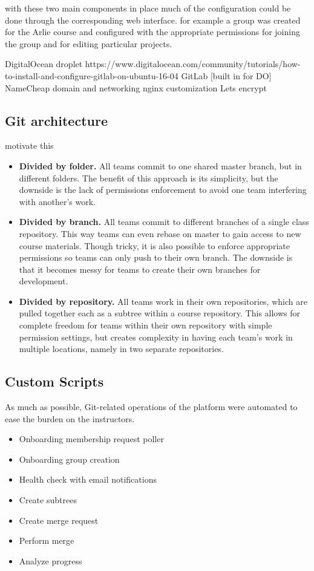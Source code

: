 \documentclass[12pt,twoside,vi]{mitthesis}
\newcommand{\draft}[1]{{\color{blue} #1}}
\begin{document}
{with these two main components in place much of the configuration could be done through the corresponding web interface. for example a group was created for the Arlie course and configured with the appropriate permissions for joining the group and for editing particular projects.

DigitalOcean droplet https://www.digitalocean.com/community/tutorials/how-to-install-and-configure-gitlab-on-ubuntu-16-04 
GitLab [built in for DO]
NameCheap domain and networking
nginx customization
Lets encrypt}

\subsection{Git architecture}

\draft{motivate this

\begin{itemize}
\item \textbf{Divided by folder.} All teams commit to one shared master branch, but in different folders. The benefit of this approach is its simplicity, but the downside is the lack of permissions enforcement to avoid one team interfering with another's work.
\item \textbf{Divided by branch.} All teams commit to different branches of a single class repository. This way teams can even rebase on master to gain access to new course materials. Though tricky, it is also possible to enforce appropriate permissions so teams can only push to their own branch. The downside is that it becomes messy for teams to create their own branches for development.
\item \textbf{Divided by repository.} All teams work in their own repositories, which are pulled together each as a subtree within a course repository. This allows for complete freedom for teams within their own repository with simple permission settings, but creates complexity in having each team's work in multiple locations, namely in two separate repositories. 
\end{itemize}
}

\subsection{Custom Scripts}

\draft{As much as possible, Git-related operations of the platform were automated to ease the burden on the instructors. 
\begin{itemize}
\item Onboarding membership request poller
\item Onboarding group creation
\item Health check with email notifications
\item Create subtrees
\item Create merge request
\item Perform merge
\item Analyze progress
\end{itemize}
}
\end{document}

